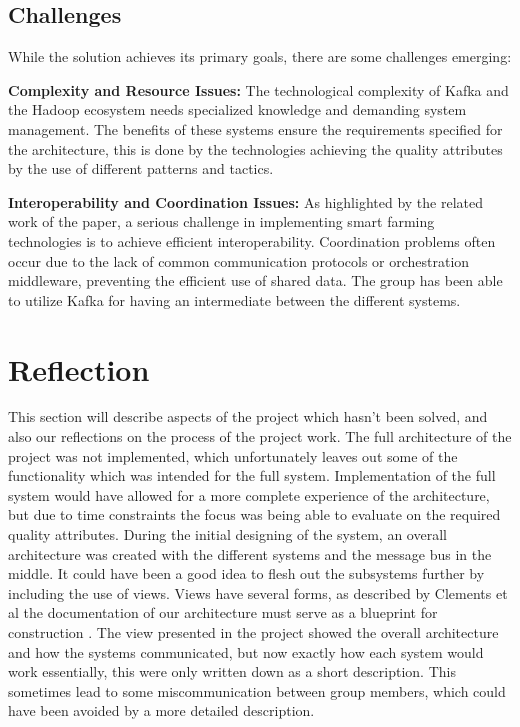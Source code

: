 \documentclass[conference]{IEEEtran}
\begin{document}
\subsection{Challenges}
While the solution achieves its primary goals, there are some challenges emerging:

\textbf{Complexity and Resource Issues:} The technological complexity of Kafka and the Hadoop ecosystem needs specialized knowledge and demanding system management. The benefits of these systems ensure the requirements specified for the architecture, this is done by the technologies achieving the quality attributes by the use of different patterns and tactics.

\textbf{Interoperability and Coordination Issues:} As highlighted by the related work of the paper, a serious challenge in implementing smart farming technologies is to achieve efficient interoperability. Coordination problems often occur due to the lack of common communication protocols or orchestration middleware, preventing the efficient use of shared data. The group has been able to utilize Kafka for having an intermediate between the different systems.

\section{Reflection}

This section will describe aspects of the project which hasn't been solved, and also our reflections on the process of the project work. \newline
The full architecture of the project was not implemented, which unfortunately leaves out some of the functionality which was intended for the full system. Implementation of the full system would have allowed for a more complete experience of the architecture, but due to time constraints the focus was being able to evaluate on the required quality attributes.
During the initial designing of the system, an overall architecture was created with the different systems and the message bus in the middle. It could have been a good idea to flesh out the subsystems further by including the use of views. Views have several forms, as described by Clements et al the documentation of our architecture must serve as a blueprint for construction \cite{Clements_2014}.
The view presented in the project showed the overall architecture and how the systems communicated, but now exactly how each system would work essentially, this were only written down as a short description. This sometimes lead to some miscommunication between group members, which could have been avoided by a more detailed description. \newline
\end{document}
